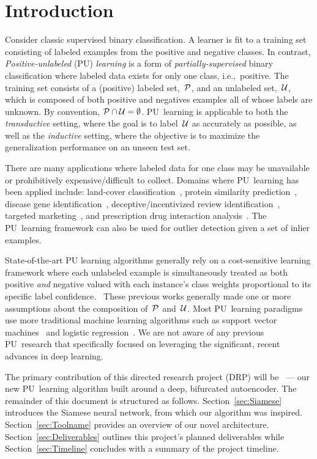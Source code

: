 \section{Introduction}

Consider classic supervised binary classification.  A learner is fit to a training set consisting of labeled examples from the positive and negative classes.  In contrast, \textit{Positive-unlabeled} (PU) \textit{learning} is a form of \textit{partially-supervised} binary classification where labeled data exists for only one class, i.e.,~positive.  The training set consists of a (positive) labeled set,~$\mathcal{P}$, and an unlabeled set,~$\mathcal{U}$, which is composed of both positive and negatives examples all of whose labels are unknown.  By convention, ${\mathcal{P}\cap\mathcal{U}=\emptyset}$.  PU~learning is applicable to both the \textit{transductive} setting, where the goal is to label~$\mathcal{U}$ as accurately as possible, as well as the \textit{inductive} setting, where the objective is to maximize the generalization performance on an unseen test set.

There are many applications where labeled data for one class may be unavailable or prohibitively expensive/difficult to collect. Domains where PU~learning has been applied include: land-cover classification~\cite{Li:2011}, protein similarity prediction~\cite{Elkan:2008}, disease gene identification~\cite{Yang:2012}, deceptive/incentivized review identification~\cite{Ren:2014}, targeted marketing~\cite{Yi:2017}, and prescription drug interaction analysis~\cite{Liu:2017}. The PU~learning framework can also be used for outlier detection given a set of inlier examples.~\cite{Scott:2009}

State-of-the-art PU learning algorithms generally rely on a cost-sensitive learning framework where each unlabeled example is simultaneously treated as both positive \textit{and} negative valued with each instance's class weights proportional to its specific label confidence.~\cite{Elkan:2008}  These previous works generally made one or more assumptions about the composition of~$\mathcal{P}$ and~$\mathcal{U}$. Most PU~learning paradigms use more traditional machine learning algorithms such as support vector machines~\cite{Elkan:2008} and logistic regression~\cite{Lee:2003}.  We are not aware of any previous PU~research that specifically focused on leveraging the significant, recent advances in deep learning.

The primary contribution of this directed research project (DRP) will be \toolname\ --- our new PU~learning algorithm built around a deep, bifurcated autoencoder.  The remainder of this document is structured as follows.  Section~\ref{sec:Siamese} introduces the Siamese neural network, from which our algorithm was inspired.  Section~\ref{sec:Toolname} provides an overview of our novel architecture.  Section~\ref{sec:Deliverables} outlines this project's planned deliverables while Section~\ref{sec:Timeline} concludes with a summary of the project timeline.

